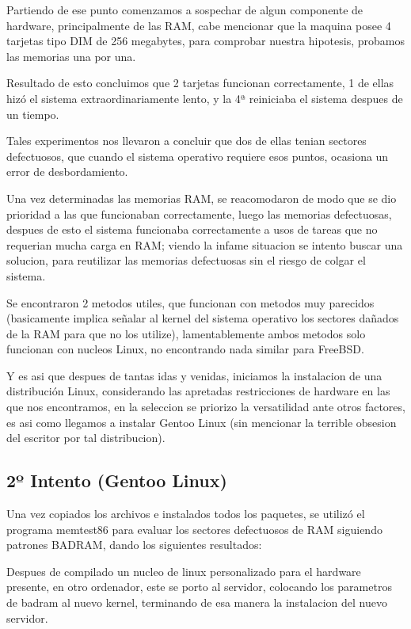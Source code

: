 \documentclass[letterpaper,11pt]{article}
\begin{document}
Partiendo de ese punto comenzamos a sospechar de algun componente de hardware,
principalmente de las RAM, cabe mencionar que la maquina posee 4 tarjetas tipo
DIM de 256 megabytes, para comprobar nuestra hipotesis, probamos las memorias
una por una.

Resultado de esto concluimos que 2 tarjetas funcionan correctamente, 1 de ellas
hizó el sistema extraordinariamente lento, y la 4ª reiniciaba el sistema despues
de un tiempo.

Tales experimentos nos llevaron a concluir que dos de ellas tenian sectores
defectuosos, que cuando el sistema operativo requiere esos puntos, ocasiona un
error de desbordamiento.

Una vez determinadas las memorias RAM, se reacomodaron de modo que se dio
prioridad a las que funcionaban correctamente, luego las memorias defectuosas,
despues de esto el sistema funcionaba correctamente a usos de tareas que no
requerian mucha carga en RAM; viendo la infame situacion se intento buscar una
solucion, para reutilizar las memorias defectuosas sin el riesgo de colgar el
sistema.

Se encontraron 2 metodos utiles, que funcionan con metodos muy parecidos
(basicamente implica señalar al kernel del sistema operativo los sectores
dañados de la RAM para que no los utilize), lamentablemente ambos metodos solo
funcionan con nucleos Linux, no encontrando nada similar para FreeBSD.

Y es asi que despues de tantas idas y venidas, iniciamos la instalacion de una
distribución Linux, considerando las apretadas restricciones de hardware en las
que nos encontramos, en la seleccion se priorizo la versatilidad ante otros
factores, es asi como llegamos a instalar Gentoo Linux (sin mencionar la
terrible obsesion del escritor por tal distribucion).

\subsection{2º Intento (Gentoo Linux)}
Una vez copiados los archivos e instalados todos los paquetes, se utilizó el
programa memtest86 para evaluar los sectores defectuosos de RAM siguiendo
patrones BADRAM, dando los siguientes resultados:

Despues de compilado un nucleo de linux personalizado para el hardware presente,
en otro ordenador, este se porto al servidor, colocando los parametros de badram
al nuevo kernel, terminando de esa manera la instalacion del nuevo servidor.
\end{document}
